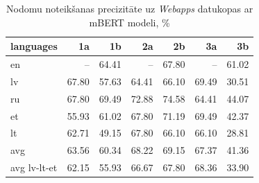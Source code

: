 \begin{table}[htbp]
  \centering
  \caption{Nodomu noteikšanas precizitāte uz \textit{Webapps} datukopas ar mBERT modeli, \%}
    \begin{tabular}{lrrrrrr}\toprule
    languages & 1a & 1b & 2a & 2b & 3a & 3b \\\midrule

    en    &   --  & \cellcolor[rgb]{ .984,  .961,  .973}64.41 &  --   & \cellcolor[rgb]{ .863,  .902,  .957}67.80 &   --  & \cellcolor[rgb]{ .984,  .906,  .918}61.02 \\
    lv    & \cellcolor[rgb]{ .863,  .902,  .957}67.80 & \cellcolor[rgb]{ .984,  .855,  .867}57.63 & \cellcolor[rgb]{ .984,  .961,  .973}64.41 & \cellcolor[rgb]{ .988,  .988,  1}66.10 & \cellcolor[rgb]{ .737,  .812,  .914}69.49 & \cellcolor[rgb]{ .973,  .435,  .443}30.51 \\
    ru    & \cellcolor[rgb]{ .863,  .902,  .957}67.80 & \cellcolor[rgb]{ .737,  .812,  .914}69.49 & \cellcolor[rgb]{ .482,  .631,  .824}72.88 & \cellcolor[rgb]{ .353,  .541,  .776}74.58 & \cellcolor[rgb]{ .984,  .961,  .973}64.41 & \cellcolor[rgb]{ .976,  .647,  .655}44.07 \\
    et    & \cellcolor[rgb]{ .98,  .827,  .839}55.93 & \cellcolor[rgb]{ .984,  .906,  .918}61.02 & \cellcolor[rgb]{ .863,  .902,  .957}67.80 & \cellcolor[rgb]{ .608,  .722,  .867}71.19 & \cellcolor[rgb]{ .737,  .812,  .914}69.49 & \cellcolor[rgb]{ .976,  .62,  .627}42.37 \\
    lt    & \cellcolor[rgb]{ .984,  .933,  .945}62.71 & \cellcolor[rgb]{ .98,  .725,  .733}49.15 & \cellcolor[rgb]{ .863,  .902,  .957}67.80 & \cellcolor[rgb]{ .988,  .988,  1}66.10 & \cellcolor[rgb]{ .988,  .988,  1}66.10 & \cellcolor[rgb]{ .973,  .412,  .42}28.81 \\\bottomrule
    avg   & 63.56 & 60.34 & 68.22 & 69.15 & 67.37 & 41.36 \\
    avg lv-lt-et & 62.15 & 55.93 & 66.67 & 67.80 & 68.36 & 33.90 \\
    \end{tabular}%
  \label{tab:webapps-bert}%
\end{table}%


